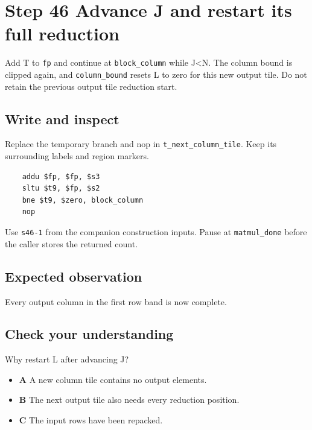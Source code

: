 \section{Step 46 Advance J and restart its full reduction}\label{matmul-s46}

Add T to \texttt{fp} and continue at \texttt{block\_column} while J<N. The column bound is clipped again, and \texttt{column\_bound} resets L to zero for this new output tile. Do not retain the previous output tile reduction start.

\subsection{Write and inspect}
Replace the temporary branch and nop in \texttt{t\_next\_column\_tile}. Keep its surrounding labels and region markers.

\begin{verbatim}
    addu $fp, $fp, $s3
    sltu $t9, $fp, $s2
    bne $t9, $zero, block_column
    nop
\end{verbatim}
Use \texttt{s46-1} from the companion construction inputs. Pause at \texttt{matmul\_done} before the caller stores the returned count.

\subsection{Expected observation}
Every output column in the first row band is now complete.

\subsection{Check your understanding}
Why restart L after advancing J?

\begin{itemize}
  \item \textbf{A} A new column tile contains no output elements.
  \item \textbf{B} The next output tile also needs every reduction position.
  \item \textbf{C} The input rows have been repacked.
\end{itemize}
